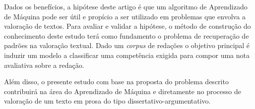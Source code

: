 Dados os benefícios, a hipótese deste artigo é que um algoritmo de Aprendizado 
de Máquina pode ser útil e propício a ser utilizado em problemas que envolva a 
valoração de textos. Para avaliar e validar a hipótese, o método de construção 
do conhecimento deste estudo terá como fundamento o problema de recuperação 
de padrões na valoração textual. Dado um \textit{corpus} de redações o objetivo 
principal é induzir um modelo a classificar uma competência exigida para compor 
uma nota avaliativa sobre a redação. 

Além disso, o presente estudo com base na proposta do problema descrito 
contribuirá na área do Aprendizado de Máquina e diretamente no processo de 
valoração de um texto em prosa do tipo dissertativo-argumentativo.
